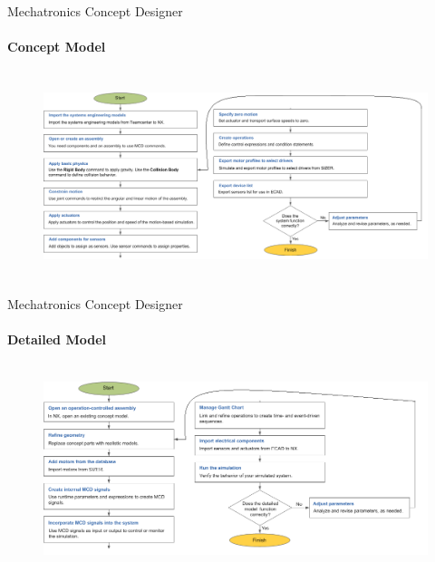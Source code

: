 \documentclass[aspectratio=169]{beamer}
\begin{document}
\begin{frame}[t]{Mechatronics Concept Designer}
\framesubtitle{Concept Model}
    \vspace{-0.6cm}
    \begin{figure}[H]
        \centering\includegraphics[height=6cm,width=1\textwidth,keepaspectratio]{mcd_concept_model_flowchart.png}
        \label{fig:mcd_concept_model_flowchart.png}
    \end{figure}
\end{frame}

\begin{frame}[t]{Mechatronics Concept Designer}
\framesubtitle{Detailed Model}
    \vspace{-0.6cm}
    \begin{figure}[H]
        \centering\includegraphics[height=6cm,width=1\textwidth,keepaspectratio]{mcd_detailed_model_flowchart.png}
        \label{fig:mcd_detailed_model_flowchart.png}
    \end{figure}
\end{frame}
\end{document}
